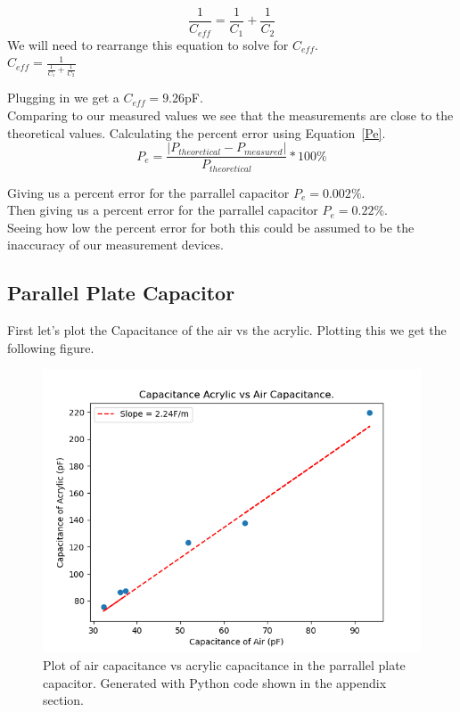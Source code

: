 \documentclass[10pt]{article}
\begin{document}
\begin{equation}\label{PCC}
  \frac{1}{C_{eff}} = \frac{1}{C_{1}} + \frac{1}{C_{2}}
\end{equation}
We will need to rearrange this equation to solve for $C_{eff}$.\\
$C_{eff} = \frac{1}{\frac{1}{C_{1}} + \frac{1}{C_{2}}}$

Plugging in we get a $C_{eff} = 9.26$pF.\\

Comparing to our measured values we see that the
measurements are close to the theoretical values.
Calculating the percent error using Equation~\ref{Pe}.\\

\begin{equation}\label{Pe}
  P_{e} = \frac{|P_{theoretical} - P_{measured}|}{P_{theoretical}} * 100 \%
\end{equation}

Giving us a percent error for the parrallel capacitor $P_{e} = 0.002\%$.\\
Then giving us a percent error for the parrallel capacitor $P_{e} = 0.22\%$.\\
Seeing how low the percent error for both this could be assumed to be the inaccuracy of our
measurement devices.\\
\newpage
\subsection*{Parallel Plate Capacitor}

First let's plot the Capacitance of the air vs the acrylic. 
Plotting this we get the following figure.

\begin{figure}[ht]\label{Graph}
  \begin{center}
    \includegraphics[scale=.50]{capplot.png}
    \caption[short]{Plot of air capacitance vs acrylic capacitance in the parrallel plate capacitor. Generated with Python code shown in the appendix section.}
  \end{center}
\end{figure}
\end{document}
